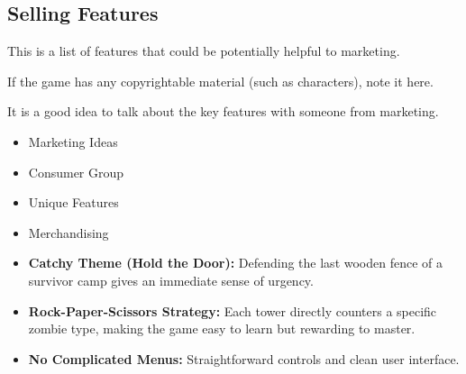 \subsection{Selling Features}

\begin{guidance}
This is a list of features that could be potentially helpful to marketing.

If the game has any copyrightable material (such as characters), note it here.

It is a good idea to talk about the key features with someone from marketing.

\begin{itemize}[label=\textbullet]
  \item Marketing Ideas
  \item Consumer Group
  \item Unique Features
  \item Merchandising
\end{itemize}
\end{guidance}
\begin{itemize}[label=\textbullet]
  \item \textbf{Catchy Theme (Hold the Door):} Defending the last wooden fence of a survivor camp gives an immediate sense of urgency.
  \item \textbf{Rock-Paper-Scissors Strategy:} Each tower directly counters a specific zombie type, making the game easy to learn but rewarding to master.
  \item \textbf{No Complicated Menus:} Straightforward controls and clean user interface.
\end{itemize}

